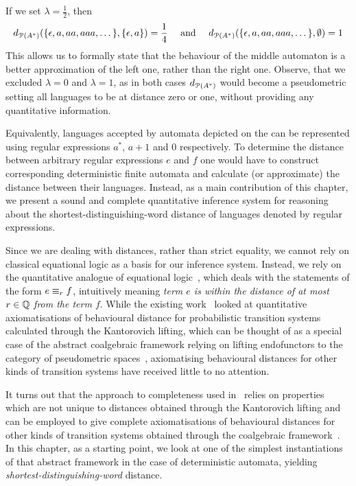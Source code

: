 If we set $\lambda = \frac{1}{2}$, then
\begin{gather*}
	d_{\mathcal{P}({A}^{\ast})}(\{\epsilon, a, aa, aaa, \dots\}, \{\epsilon, a\}) = \frac{1}{4} \quad \text{ and } \quad d_{\mathcal{P}({A}^{\ast})}(\{\epsilon,a,aa,aaa, \dots\}, \emptyset)=1
\end{gather*}
This allows us to formally state that the behaviour of the middle automaton is a better approximation of the left one, rather than the right one. Observe, that we excluded $\lambda=0$ and $\lambda=1$, as in both cases $d_{\mathcal{P}({A}^{\ast})}$ would become a pseudometric setting all languages to be at distance zero or one, without providing any quantitative information. 


Equivalently, languages accepted by automata depicted on the  can be represented using regular expressions $a^*$, $a + 1$ and $0$ respectively.  To determine the distance between arbitrary regular expressions $e$ and $f$ one would have to construct corresponding deterministic finite automata and calculate (or approximate) the distance between their languages. Instead, as a main contribution of this chapter, we present a sound and complete quantitative inference system for reasoning about the shortest-distinguishing-word distance of languages denoted by regular expressions.

Since we are dealing with distances, rather than strict equality, we cannot rely on classical equational logic as a basis for our inference system. Instead, we rely on the quantitative analogue of equational logic~\cite{Mardare:2016:Quantitative}, which deals with the statements of the form $e \equiv_{r} f$, intuitively meaning \emph{term $e$ is within the distance of at most $r \in \mathbb{Q}$ from the term $f$}. While the existing work~\cite{Bacci:2018:Algebraic,Bacci:2018:Bisimilarity,Bacci:2018:TV} looked at quantitative axiomatisations of behavioural distance for probabilistic transition systems calculated through the Kantorovich lifting, which can be thought of as a special case of the abstract coalgebraic framework relying on lifting endofunctors to the category of pseudometric spaces~\cite{Baldan:2018:Coalgebraic}, axiomatising behavioural distances for other kinds of transition systems have received little to no attention.

It turns out that the approach to completeness used in~\cite{Bacci:2018:Bisimilarity} relies on properties which are not unique to distances obtained through the Kantorovich lifting and can be employed to give complete axiomatisations of behavioural distances for other kinds of transition systems obtained through the coalgebraic framework~\cite{Baldan:2018:Coalgebraic}. In this chapter, as a starting point, we look at one of the simplest instantiations of that abstract framework in the case of deterministic automata, yielding \emph{shortest-distinguishing-word} distance. 

